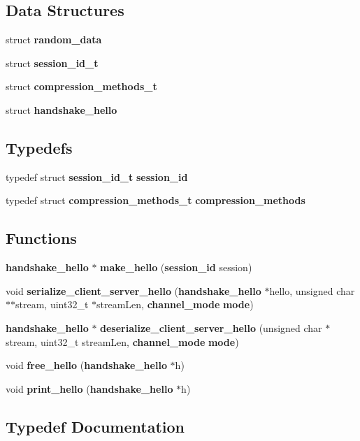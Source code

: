 \subsection*{Data Structures}
\begin{DoxyCompactItemize}
\item 
struct {\bf random\+\_\+data}
\item 
struct {\bf session\+\_\+id\+\_\+t}
\item 
struct {\bf compression\+\_\+methods\+\_\+t}
\item 
struct {\bf handshake\+\_\+hello}
\end{DoxyCompactItemize}
\subsection*{Typedefs}
\begin{DoxyCompactItemize}
\item 
typedef struct {\bf session\+\_\+id\+\_\+t} {\bf session\+\_\+id}
\item 
typedef struct {\bf compression\+\_\+methods\+\_\+t} {\bf compression\+\_\+methods}
\end{DoxyCompactItemize}
\subsection*{Functions}
\begin{DoxyCompactItemize}
\item 
{\bf handshake\+\_\+hello} $\ast$ {\bf make\+\_\+hello} ({\bf session\+\_\+id} session)
\item 
void {\bf serialize\+\_\+client\+\_\+server\+\_\+hello} ({\bf handshake\+\_\+hello} $\ast$hello, unsigned char $\ast$$\ast$stream, uint32\+\_\+t $\ast$stream\+Len, {\bf channel\+\_\+mode} {\bf mode})
\item 
{\bf handshake\+\_\+hello} $\ast$ {\bf deserialize\+\_\+client\+\_\+server\+\_\+hello} (unsigned char $\ast$stream, uint32\+\_\+t stream\+Len, {\bf channel\+\_\+mode} {\bf mode})
\item 
void {\bf free\+\_\+hello} ({\bf handshake\+\_\+hello} $\ast$h)
\item 
void {\bf print\+\_\+hello} ({\bf handshake\+\_\+hello} $\ast$h)
\end{DoxyCompactItemize}


\subsection{Typedef Documentation}
